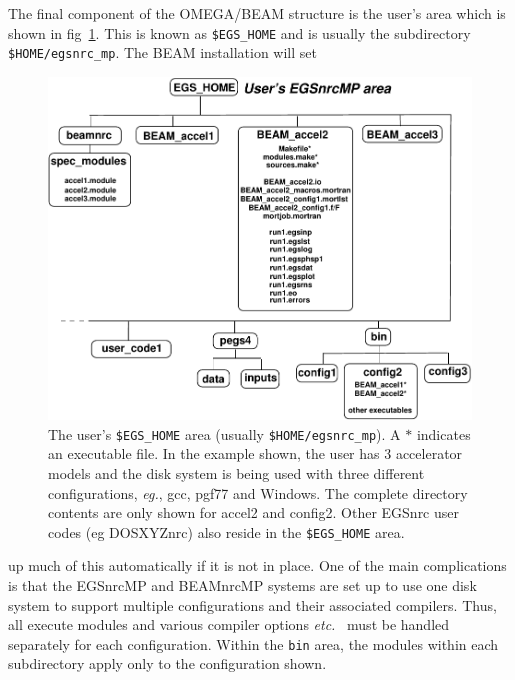 \documentclass[12pt,twoside]{article}
\newcommand{\etc}{{\em etc.}}
\newcommand{\eg}{{\em eg.}}
\begin{document}
The final component of the OMEGA/BEAM structure is the user's area which
is shown in fig~\ref{fig_users_area}.  This is known as {\tt \$EGS\_HOME}
and is usually the subdirectory {\tt \$HOME/egsnrc\_mp}.  The BEAM
installation will set
\begin{figure}[hbpt]
\leavevmode
\begin{center}
\mbox{}\hspace{0cm}
\includegraphics[width=17cm]{figures/nrc_users_area}
  \caption[The user's \$EGS\_HOME area.]{The user's {\tt \$EGS\_HOME}
  area (usually {\tt \$HOME/egsnrc\_mp}).  A $*$ indicates an executable
  file. In the example shown, the user has 3 accelerator models and the
  disk system is being used with three different configurations, \eg, gcc,
  pgf77 and Windows.  The complete directory contents are only shown
  for accel2 and config2.  Other EGSnrc user codes (eg DOSXYZnrc) also
  reside in the {\tt \$EGS\_HOME} area.}
\label{fig_users_area}
\end{center}
\end{figure}
up much of this automatically if it is not in place.
One of the main complications is that the
EGSnrcMP and BEAMnrcMP systems are
set up to use one disk system to support multiple configurations and
their associated compilers.
Thus, all execute modules and various compiler options
\etc~ must be handled separately for each configuration.
Within the \verb+bin+ area, the modules within
each subdirectory apply only to the configuration shown.
\end{document}
